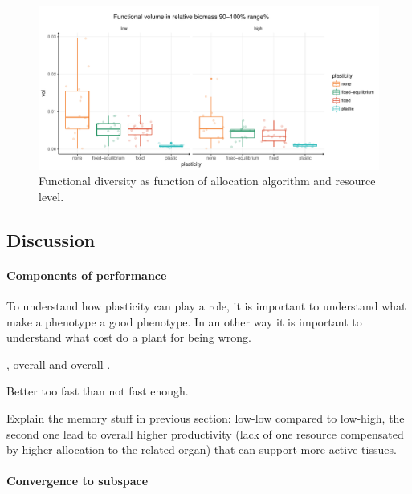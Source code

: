 \begin{figure}\label{fig:function_div}
\includegraphics[width = \textwidth]{./2_PP/Figures/Landscape/plot_fdiv.pdf}
\caption{Functional diversity as function of allocation algorithm and resource level.}
\end{figure}




\subsection{Discussion}

\paragraph{Components of performance}

To understand how plasticity can play a role, it is important to understand what make a phenotype a good phenotype. In an other way it is important to understand what cost do a plant for being wrong.

, overall  and overall .

Better too fast than not fast enough.

Explain the memory stuff in previous section: low-low compared to low-high, the second one lead to overall higher productivity (lack of one resource compensated by higher allocation to the related organ) that can support more active tissues. 


\paragraph{Convergence to subspace}

